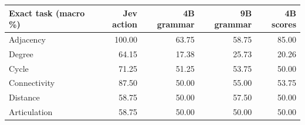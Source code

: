 \begin{tabular}{lrrrr}
\toprule
Exact task (macro \%) & Jev action & 4B grammar & 9B grammar & 4B scores \\
\midrule
Adjacency & 100.00 & 63.75 & 58.75 & 85.00 \\
Degree & 64.15 & 17.38 & 25.73 & 20.26 \\
Cycle & 71.25 & 51.25 & 53.75 & 50.00 \\
Connectivity & 87.50 & 50.00 & 55.00 & 53.75 \\
Distance & 58.75 & 50.00 & 57.50 & 50.00 \\
Articulation & 58.75 & 50.00 & 50.00 & 50.00 \\
\bottomrule
\end{tabular}
